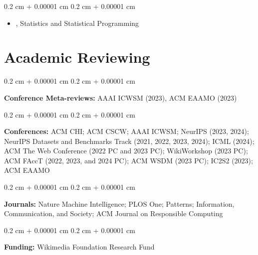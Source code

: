 \documentclass[10pt, letterpaper]{article}
\newenvironment{highlights}{
    \begin{itemize}[
        topsep=0.10 cm,
        parsep=0.10 cm,
        partopsep=0pt,
        itemsep=0pt,
        leftmargin=0.4 cm + 10pt
    ]
}{
    \end{itemize}
} %
\newenvironment{onecolentry}{
    \begin{adjustwidth}{
        0.2 cm + 0.00001 cm
    }{
        0.2 cm + 0.00001 cm
    }
}{
    \end{adjustwidth}
} %
\let\hrefWithoutArrow\href
\renewcommand{\href}[2]{\hrefWithoutArrow{#1}{\ifthenelse{\equal{#2}{}}{ }{#2 }\raisebox{.15ex}{\footnotesize \faExternalLink*}}}
\begin{document}
        \vspace{0.10 cm}
        \begin{onecolentry}
            \begin{highlights}
                \item \href{https://wiki.communitydata.science/Workshops_and_Classes}{MTS 525}, Statistics and Statistical Programming
            \end{highlights}
        \end{onecolentry}



    
    \section{Academic Reviewing}



        
        \begin{onecolentry}
            \textbf{Conference Meta-reviews:} AAAI ICWSM (2023), ACM EAAMO (2023)
        \end{onecolentry}

        \vspace{0.2 cm}

        \begin{onecolentry}
            \textbf{Conferences:} ACM CHI; ACM CSCW; AAAI ICWSM; NeurIPS (2023, 2024); NeurIPS Datasets and Benchmarks Track (2021, 2022, 2023, 2024); ICML (2024); ACM The Web Conference (2022 PC and 2023 PC); WikiWorkshop (2023 PC); ACM FAccT (2022, 2023, and 2024 PC); ACM WSDM (2023 PC); IC2S2 (2023); ACM EAAMO
        \end{onecolentry}

        \vspace{0.2 cm}

        \begin{onecolentry}
            \textbf{Journals:} Nature Machine Intelligence; PLOS One; Patterns; Information, Communication, and Society; ACM Journal on Responsible Computing
        \end{onecolentry}

        \vspace{0.2 cm}

        \begin{onecolentry}
            \textbf{Funding:} Wikimedia Foundation Research Fund
        \end{onecolentry}

        \vspace{0.2 cm}
\end{document}
